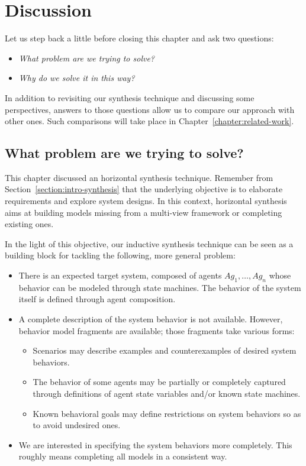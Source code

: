 \section{Discussion\label{section:inductive-synthesis-discussion}}

Let us step back a little before closing this chapter and ask two questions:
\begin{itemize}
\item \emph{What problem are we trying to solve?}
\item \emph{Why do we solve it in this way?}
\end{itemize}
In addition to revisiting our synthesis technique and discussing some perspectives, answers to those questions allow us to compare our approach with other ones. Such comparisons will take place in Chapter~\ref{chapter:related-work}.

\subsection{What problem are we trying to solve?}

This chapter discussed an horizontal synthesis technique. Remember from Section~\ref{section:intro-synthesis} that the underlying objective is to elaborate requirements and explore system designs. In this context, horizontal synthesis aims at building models missing from a multi-view framework or completing existing ones.

In the light of this objective, our inductive synthesis technique can be seen as a building block for tackling the following, more general problem:
\begin{itemize}
\item There is an expected target system, composed of agents $Ag_1, \ldots, Ag_n$ whose behavior can be modeled through state machines. The behavior of the system itself is defined through agent composition.
\item A complete description of the system behavior is not available. However, behavior model fragments are available; those fragments take various forms:
\begin{itemize}
\item Scenarios may describe examples and counterexamples of desired system behaviors.
\item The behavior of some agents may be partially or completely captured through definitions of agent state variables and/or known state machines.
\item Known behavioral goals may define restrictions on system behaviors so as to avoid undesired ones.
\end{itemize}
\item We are interested in specifying the system behaviors more completely. This roughly means completing all models in a consistent way.
\end{itemize}

